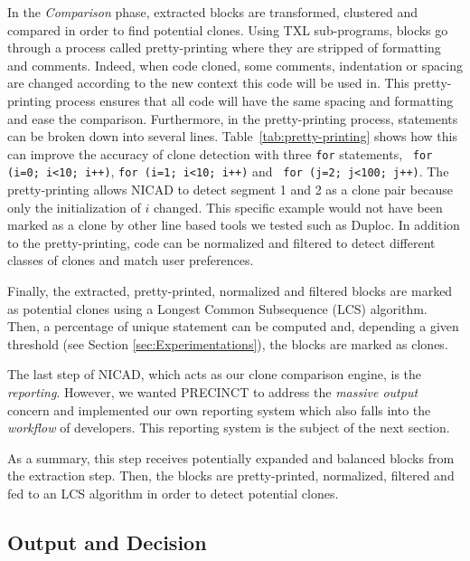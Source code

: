\documentclass[conference]{IEEEtran}
\begin{document}
In the \textit{Comparison} phase, extracted blocks are transformed, clustered and compared in order to find potential clones.
Using TXL sub-programs, blocks go through a process called pretty-printing where they are stripped of formatting and comments.
Indeed, when code cloned, some comments, indentation or spacing are changed according to the new context this code will be used in.
This pretty-printing process ensures that all code will have the same spacing and formatting and ease the comparison.
Furthermore, in the pretty-printing process, statements can be broken down into several lines.
Table~\ref{tab:pretty-printing} shows how this can improve the accuracy of clone detection with three \texttt{for} statements, \texttt{ for (i=0; i<10; i++)}, \texttt{for (i=1; i<10; i++)} and \texttt{ for (j=2; j<100; j++)}.
The pretty-printing allows NICAD to detect segment 1 and 2 as a clone pair because only the initialization of $i$ changed.
This specific example would not have been marked as a clone by other line based tools we tested such as Duploc\cite{Ducasse1999}.
In addition to the pretty-printing, code can be normalized and filtered to detect different classes of clones and match user preferences.



Finally, the extracted, pretty-printed, normalized and filtered blocks are marked as potential clones using a Longest Common Subsequence (LCS) algorithm\cite{Hunt1977}.
Then, a percentage of unique statement can be computed and, depending a given threshold (see Section \ref{sec:Experimentations}), the blocks are marked as clones.

The last step of NICAD, which acts as our clone comparison engine, is the \textit{reporting}.
However, we wanted PRECINCT to address the \textit{massive output} concern and  implemented our own reporting system which also falls into the \textit{workflow} of developers.
This reporting system is the subject of the next section.

As a summary, this step receives potentially expanded and balanced blocks from the extraction step.
Then, the blocks are pretty-printed, normalized, filtered and fed to an LCS algorithm in order to detect potential clones.

\subsection{Output and Decision}
\label{sub:Output and Decision}
\end{document}
